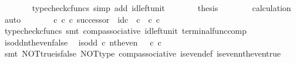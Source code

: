 \begin{isabellebody}
\ \ \ \ \ \ \isamarkupfalse%
\ {\isacharparenleft}{\kern0pt}typecheck{\isacharunderscore}{\kern0pt}cfuncs{\isacharcomma}{\kern0pt}\ simp\ add{\isacharcolon}{\kern0pt}\ id{\isacharunderscore}{\kern0pt}left{\isacharunderscore}{\kern0pt}unit{}{\isacharparenright}{\kern0pt}\isanewline
\ \ \ \ \isamarkupfalse%
\ \isamarkupfalse%
\ {\isacharquery}{\kern0pt}thesis\isanewline
\ \ \ \ \ \ \isamarkupfalse%
\ calculation\ \isamarkupfalse%
\ auto\isanewline
\ \ \isamarkupfalse%
\isanewline
\isanewline
\ \ \isamarkupfalse%
\ {\isachardoublequoteopen}{\isacharparenleft}{\kern0pt}{\isasymt}\ {\isasymcirc}\isactrlsub c\ {\isasymbeta}\isactrlbsub {\isasymnat}\isactrlsub c\isactrlesub {\isacharparenright}{\kern0pt}\ {\isasymcirc}\isactrlsub c\ successor\ {\isacharequal}{\kern0pt}\ id\isactrlsub c\ {\isasymOmega}\ {\isasymcirc}\isactrlsub c\ {\isasymt}\ {\isasymcirc}\isactrlsub c\ {\isasymbeta}\isactrlbsub {\isasymnat}\isactrlsub c\isactrlesub {\isachardoublequoteclose}\isanewline
\ \ \ \ \isamarkupfalse%
\ {\isacharparenleft}{\kern0pt}typecheck{\isacharunderscore}{\kern0pt}cfuncs{\isacharcomma}{\kern0pt}\ smt\ comp{\isacharunderscore}{\kern0pt}associative{}\ id{\isacharunderscore}{\kern0pt}left{\isacharunderscore}{\kern0pt}unit{}\ terminal{\isacharunderscore}{\kern0pt}func{\isacharunderscore}{\kern0pt}comp{\isacharparenright}{\kern0pt}\isanewline
{}\isamarkupfalse%
%
\endisatagproof
{\isafoldproof}%
%
\isadelimproof
\isanewline
%
\endisadelimproof
\isanewline
{}\isamarkupfalse%
\ is{\isacharunderscore}{\kern0pt}odd{\isacharunderscore}{\kern0pt}nth{\isacharunderscore}{\kern0pt}even{\isacharunderscore}{\kern0pt}false{\isacharcolon}{\kern0pt}\isanewline
\ \ {\isachardoublequoteopen}is{\isacharunderscore}{\kern0pt}odd\ {\isasymcirc}\isactrlsub c\ nth{\isacharunderscore}{\kern0pt}even\ {\isacharequal}{\kern0pt}\ {\isasymf}\ {\isasymcirc}\isactrlsub c\ {\isasymbeta}\isactrlbsub {\isasymnat}\isactrlsub c\isactrlesub {\isachardoublequoteclose}\isanewline
%
\isadelimproof
\ \ %
\endisadelimproof
%
\isatagproof
{}\isamarkupfalse%
\ {\isacharparenleft}{\kern0pt}smt\ NOT{\isacharunderscore}{\kern0pt}true{\isacharunderscore}{\kern0pt}is{\isacharunderscore}{\kern0pt}false\ NOT{\isacharunderscore}{\kern0pt}type\ comp{\isacharunderscore}{\kern0pt}associative{}\ is{\isacharunderscore}{\kern0pt}even{\isacharunderscore}{\kern0pt}def{}\ is{\isacharunderscore}{\kern0pt}even{\isacharunderscore}{\kern0pt}nth{\isacharunderscore}{\kern0pt}even{\isacharunderscore}{\kern0pt}true\isanewline

\end{isabellebody}
